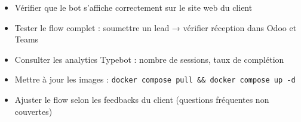 \documentclass[11pt, a4paper]{article}
\begin{document}
\begin{checklist}
  \begin{itemize}
    \item[$\square$] Vérifier que le bot s'affiche correctement sur le site web du client
    \item[$\square$] Tester le flow complet : soumettre un lead → vérifier réception dans Odoo et Teams
    \item[$\square$] Consulter les analytics Typebot : nombre de sessions, taux de complétion
    \item[$\square$] Mettre à jour les images : \texttt{docker compose pull \&\& docker compose up -d}
    \item[$\square$] Ajuster le flow selon les feedbacks du client (questions fréquentes non couvertes)
  \end{itemize}
\end{checklist}
\end{document}
